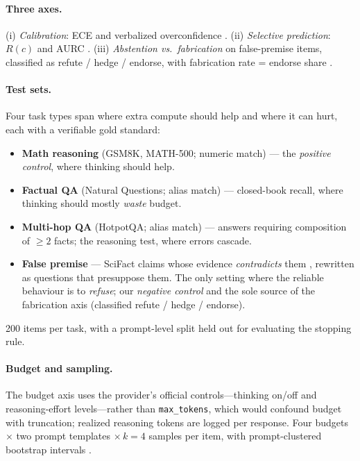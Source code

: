 \documentclass[11pt]{article}
\begin{document}
\paragraph{Three axes.} (i) \emph{Calibration}: ECE \citep{Guo2017ECE} and
verbalized overconfidence
\citep{Kadavath2022KnowWhatTheyKnow,Tian2023JustAsk,Xiong2023Confidence}.
(ii) \emph{Selective prediction}: $R(c)$ and AURC
\citep{Geifman2017Selective,Slobodkin2024Abstention}. (iii)
\emph{Abstention vs.\ fabrication} on false-premise items, classified as
refute / hedge / endorse, with fabrication rate = endorse share
\citep{Sathyanathan2025Presuppositions,Kirichenko2025AbstentionBench}.

\paragraph{Test sets.} Four task types span where extra compute should help and
where it can hurt, each with a verifiable gold standard:
\begin{itemize}\itemsep1pt
  \item \textbf{Math reasoning} (GSM8K, MATH-500; numeric match) --- the
  \emph{positive control}, where thinking should help.
  \item \textbf{Factual QA} (Natural Questions; alias match) --- closed-book
  recall, where thinking should mostly \emph{waste} budget.
  \item \textbf{Multi-hop QA} (HotpotQA; alias match) --- answers requiring
  composition of $\ge\!2$ facts; the reasoning test, where errors cascade.
  \item \textbf{False premise} --- SciFact claims whose evidence
  \emph{contradicts} them \citep{Wadden2020SciFact}, rewritten as questions
  that presuppose them. The only setting where the reliable behaviour is to
  \emph{refuse}; our \emph{negative control} and the sole source of the
  fabrication axis (classified refute / hedge / endorse).
\end{itemize}
200 items per task, with a prompt-level split held out for evaluating the
stopping rule.

\paragraph{Budget and sampling.} The budget axis uses the provider's official
controls---thinking on/off and reasoning-effort levels---rather than
\texttt{max\_tokens}, which would confound budget with truncation; realized
reasoning tokens are logged per response. Four budgets $\times$ two prompt
templates $\times\,k{=}4$ samples per item, with prompt-clustered bootstrap
intervals \citep{Zhang2025BeyondSingular,Miller2024ErrorBars}.
\end{document}
